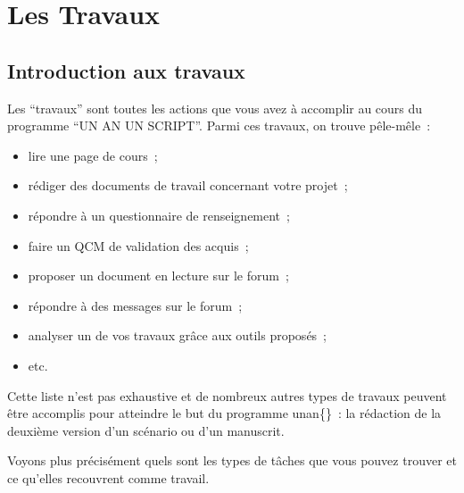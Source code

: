 % 
% 
% 
% 
% 
% 
% 
% 

\chapter{Les Travaux}\hypertarget{les-travaux}{}\label{les-travaux}

\section{Introduction aux travaux}\hypertarget{introduction-aux-travaux}{}\label{introduction-aux-travaux}

Les \enquote{travaux} sont toutes les actions que vous avez à accomplir au cours du programme “UN AN UN SCRIPT”. Parmi ces travaux, on trouve pêle-mêle~{}:

\begin{itemize}
\item lire une page de cours~{};
\item rédiger des documents de travail concernant votre projet~{};
\item répondre à un questionnaire de renseignement~{};
\item faire un QCM de validation des acquis~{};
\item proposer un document en lecture sur le forum~{};
\item répondre à des messages sur le forum~{};
\item analyser un de vos travaux grâce aux outils proposés~{};
\item etc.
\end{itemize}

Cette liste n'est pas exhaustive et de nombreux autres types de travaux peuvent être accomplis pour atteindre le but du programme unan\{\}~{}: la rédaction de la deuxième version d'un scénario ou d'un manuscrit.

Voyons plus précisément quels sont les types de tâches que vous pouvez trouver et ce qu'elles recouvrent comme travail.

